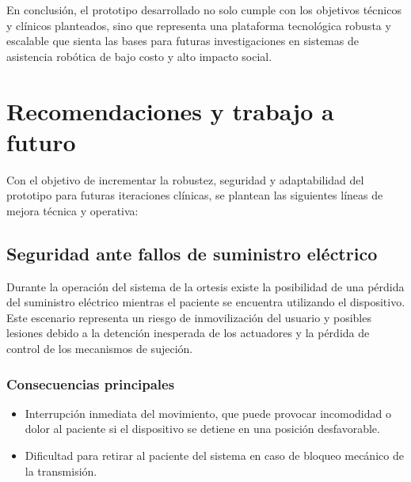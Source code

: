 En conclusión, el prototipo desarrollado no solo cumple con los objetivos técnicos y clínicos planteados, sino que representa una plataforma tecnológica robusta y escalable que sienta las bases para futuras investigaciones en sistemas de asistencia robótica de bajo costo y alto impacto social.

\section*{Recomendaciones y trabajo a futuro}
Con el objetivo de incrementar la robustez, seguridad y adaptabilidad del prototipo para futuras iteraciones clínicas, se plantean las siguientes líneas de mejora técnica y operativa:

\subsection*{Seguridad ante fallos de suministro eléctrico}
Durante la operación del sistema de la ortesis existe la posibilidad de una pérdida del suministro eléctrico mientras el paciente se encuentra utilizando el dispositivo. Este escenario representa un riesgo de inmovilización del usuario y posibles lesiones debido a la detención inesperada de los actuadores y la pérdida de control de los mecanismos de sujeción.

\subsubsection*{Consecuencias principales}
\begin{itemize}
	\item Interrupción inmediata del movimiento, que puede provocar incomodidad o dolor al paciente si el dispositivo se detiene en una posición desfavorable.
	\item Dificultad para retirar al paciente del sistema en caso de bloqueo mecánico de la transmisión.
\end{itemize}

